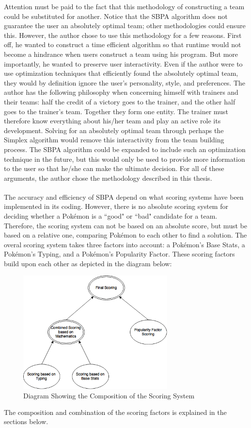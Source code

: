 \documentclass{article}
\begin{document}
Attention must be paid to the fact that this methodology of constructing a team could be substituted for another. Notice that the SBPA algorithm does not guarantee the user an absolutely optimal team; other methodologies could ensure this. However, the author chose to use this methodology for a few reasons. First off, he wanted to construct a time efficient algorithm so that runtime would not become a hindrance when users construct a team using his program. But more importantly, he wanted to preserve user interactivity. Even if the author were to use optimization techniques that efficiently found the absolutely optimal team, they would by definition ignore the user's personality, style, and preferences. The author has the following philosophy when concerning himself with trainers and their teams: half the credit of a victory goes to the trainer, and the other half goes to the trainer's team. Together they form one entity. The trainer must therefore know everything about his/her team and play an active role its development. Solving for an absolutely optimal team through perhaps the Simplex algorithm would remove this interactivity from the team building process. The SBPA algorithm could be expanded to include such an optimization technique in the future, but this would only be used to provide more information to the user so that he/she can make the ultimate decision. For all of these arguments, the author chose the methodology described in this thesis.\\\\
The accuracy and efficiency of SBPA depend on what scoring systems have been implemented in its coding. However, there is no absolute scoring system for deciding whether a Pok\'emon is a ``good" or ``bad" candidate for a team. Therefore, the scoring system can not be based on an absolute score, but must be based on a relative one, comparing Pok\'emon to each other to find a solution. The overal scoring system takes three factors into account: a Pok\'emon's Base Stats, a Pok\'emon's Typing, and a Pok\'emon's Popularity Factor. These scoring factors build upon each other as depicted in the diagram below:
\begin{figure}[H]
	\includegraphics[width=0.7\textwidth]{ScoringDiagram.png}
	\centering
	\caption{Diagram Showing the Composition of the Scoring System}\label{ScoringComposition}
\end{figure}
The composition and combination of the scoring factors is explained in the sections below.
\end{document}
